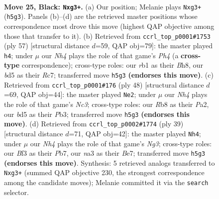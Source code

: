 \documentclass[11pt]{article}
\begin{document}
\clearpage

\begin{figure}[p]\centering
\begin{subfigure}{0.46\textwidth}\centering
\resizebox{\linewidth}{!}{%
\newchessgame
\chessboard[
  setfen={1r3r2/pp4k1/6pp/2pB3n/4pP1P/N3PbP1/PP6/1RB2K2 b - - 0 25},
  showmover=false,
  pgfstyle=straightmove, color=movearrow, markmove={h5-g3}
]}
\caption{}
\end{subfigure}\hfill
\begin{subfigure}{0.46\textwidth}\centering
\resizebox{\linewidth}{!}{%
\newchessgame
\chessboard[
  setfen={6rb/2r1pk1p/3pp2P/NB2n2p/4P1P1/1PP2P2/P2B4/2K2R2 b - - 0 29},
  showmover=false,
  pgfstyle=straightmove, color=movearrow, markmove={h5-h4}
]}
\caption{}
\end{subfigure}
\\[4pt]
\begin{subfigure}{0.46\textwidth}\centering
\resizebox{\linewidth}{!}{%
\newchessgame
\chessboard[
  setfen={2r1k3/7p/p3bpp1/B2pn3/2p4P/1PN1P3/P4PP1/3R2K1 w - - 0 25},
  showmover=false,
  pgfstyle=straightmove, color=movearrow, markmove={c3-e2}
]}
\caption{}
\end{subfigure}\hfill
\begin{subfigure}{0.46\textwidth}\centering
\resizebox{\linewidth}{!}{%
\newchessgame
\chessboard[
  setfen={2kr4/1pp1bppp/p1p3n1/P3P3/R4P2/4B1N1/1PP2P1P/5K2 b - - 5 20},
  showmover=false,
  pgfstyle=straightmove, color=movearrow, markmove={g6-h4}
]}
\caption{}
\end{subfigure}
\caption{\textbf{Move 25, Black: \texttt{Nxg3+}.} (a) Our position; Melanie plays \texttt{Nxg3+} (\texttt{h5g3}). Panels (b)--(d) are the retrieved master positions whose correspondence most drove this move (highest QAP objective among those that transfer to it). (b) Retrieved from \texttt{ccrl\_top\_p0001\#1753} (ply 57) [structural distance $d$=59, QAP obj=79]: the master played \texttt{h4}; under $\mu$ our \emph{Nh4} plays the role of that game's \emph{Ph4} (a \textbf{cross-type} correspondence); cross-type roles: our \emph{r}b1 as their \emph{B}h8, our \emph{b}d5 as their \emph{R}c7; transferred move \texttt{h5g3} \textbf{(endorses this move)}. (c) Retrieved from \texttt{ccrl\_top\_p0001\#176} (ply 48) [structural distance $d$=69, QAP obj=44]: the master played \texttt{Ne2}; under $\mu$ our \emph{Nh4} plays the role of that game's \emph{Nc3}; cross-type roles: our \emph{R}b8 as their \emph{P}a2, our \emph{b}d5 as their \emph{P}b3; transferred move \texttt{h5g3} \textbf{(endorses this move)}. (d) Retrieved from \texttt{ccrl\_top\_p0002\#1774} (ply 39) [structural distance $d$=71, QAP obj=42]: the master played \texttt{Nh4}; under $\mu$ our \emph{Nh4} plays the role of that game's \emph{Ng3}; cross-type roles: our \emph{B}f3 as their \emph{P}b7, our \emph{n}a3 as their \emph{B}e7; transferred move \texttt{h5g3} \textbf{(endorses this move)}. Synthesis: 5 retrieved analogs transferred to \texttt{Nxg3+} (summed QAP objective 230, the strongest correspondence among the candidate moves); Melanie committed it via the \texttt{search} selector.}
\label{fig:thought-m49}
\end{figure}
\end{document}
